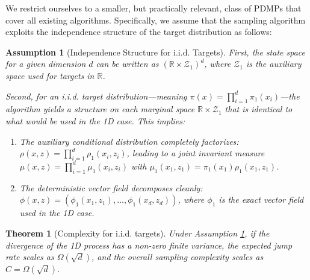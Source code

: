 \documentclass{article}
\newtheorem{assumption}{Assumption}
\newtheorem{theorem}{Theorem}
\begin{document}
We restrict ourselves to a smaller, but practically relevant, class of PDMPs that cover all existing algorithms. Specifically, we assume that the sampling algorithm exploits the independence structure of the target distribution as follows:

\begin{assumption}[Independence Structure for i.i.d. Targets]
    \label{assum:independence_structure}
    First, the state space for a given dimension $d$ can be written as $(\mathbb{R} \times \mathcal{Z}_1)^d$, where $\mathcal{Z}_1$ is the auxiliary space used for targets in $\mathbb{R}$. 
    
    Second, for an i.i.d. target distribution---meaning $\pi(x) = \prod_{i=1}^d \pi_1(x_i)$---the algorithm yields a structure on each marginal space $\mathbb{R} \times \mathcal{Z}_1$ that is identical to what would be used in the 1D case. This implies:
    \begin{enumerate}
        \item The auxiliary conditional distribution completely factorizes: $\rho(x,z) = \prod_{i=1}^d \rho_1(x_i,z_i)$, leading to a joint invariant measure $\mu(x,z) = \prod_{i=1}^d \mu_1(x_i,z_i)$ with $\mu_1(x_1,z_1) = \pi_1(x_1) \rho_1(x_1,z_1)$.
        \item The deterministic vector field decomposes cleanly: $\phi(x,z) = (\phi_1(x_1,z_1), \dots, \phi_1(x_d,z_d))$, where $\phi_1$ is the exact vector field used in the 1D case.
    \end{enumerate}
\end{assumption}

\begin{theorem}[Complexity for i.i.d. targets]
    \label{th:complexity}
    Under Assumption \ref{assum:independence_structure}, if the divergence of the 1D process has a non-zero finite variance, the expected jump rate scales as $\Omega(\sqrt{d})$, and the overall sampling complexity scales as $C = \Omega(\sqrt{d})$.
\end{theorem}
\end{document}
